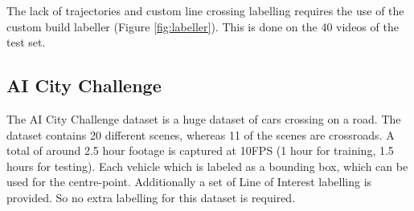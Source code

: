 The lack of trajectories and custom line crossing labelling requires the use of the custom build labeller (Figure \ref{fig:labeller}). This is done on the 40 videos of the test set.

\subsection{AI City Challenge}
The AI City Challenge dataset is a huge dataset of cars crossing on a road. The dataset contains 20 different scenes, whereas 11 of the scenes are crossroads. A total of around 2.5 hour footage is captured at 10FPS (1 hour for training, 1.5 hours for testing). Each vehicle which is labeled as a bounding box, which can be used for the centre-point. Additionally a set of Line of Interest labelling is provided. So no extra labelling for this dataset is required.

